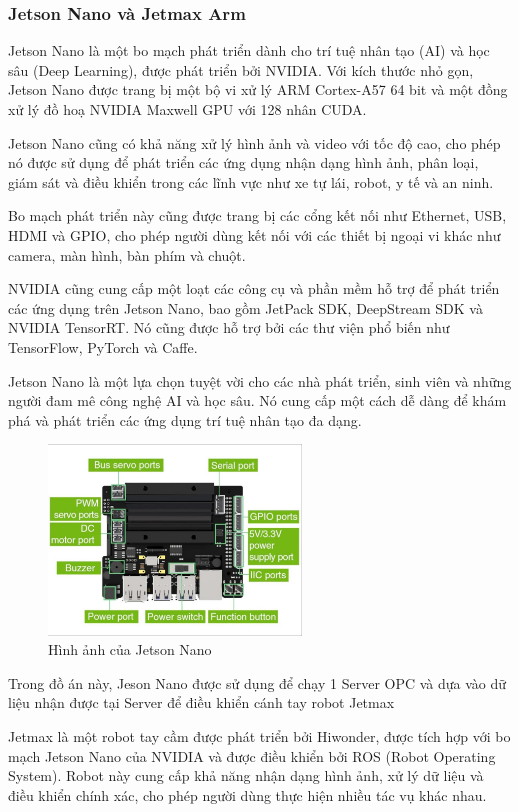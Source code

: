 \subsubsection{Jetson Nano và Jetmax Arm}
Jetson Nano là một bo mạch phát triển dành cho trí tuệ nhân tạo (AI) và học sâu (Deep Learning), được phát triển bởi NVIDIA. Với kích thước nhỏ gọn, Jetson Nano được trang bị một bộ vi xử lý ARM Cortex-A57 64 bit và một đồng xử lý đồ hoạ NVIDIA Maxwell GPU với 128 nhân CUDA.

Jetson Nano cũng có khả năng xử lý hình ảnh và video với tốc độ cao, cho phép nó được sử dụng để phát triển các ứng dụng nhận dạng hình ảnh, phân loại, giám sát và điều khiển trong các lĩnh vực như xe tự lái, robot, y tế và an ninh.

Bo mạch phát triển này cũng được trang bị các cổng kết nối như Ethernet, USB, HDMI và GPIO, cho phép người dùng kết nối với các thiết bị ngoại vi khác như camera, màn hình, bàn phím và chuột.

NVIDIA cũng cung cấp một loạt các công cụ và phần mềm hỗ trợ để phát triển các ứng dụng trên Jetson Nano, bao gồm JetPack SDK, DeepStream SDK và NVIDIA TensorRT. Nó cũng được hỗ trợ bởi các thư viện phổ biến như TensorFlow, PyTorch và Caffe.

Jetson Nano là một lựa chọn tuyệt vời cho các nhà phát triển, sinh viên và những người đam mê công nghệ AI và học sâu. Nó cung cấp một cách dễ dàng để khám phá và phát triển các ứng dụng trí tuệ nhân tạo đa dạng.
\begin{figure}[!h]
    \centering
    \includegraphics[width=0.6\textwidth]{Images/Implementation/Control/JesonNano.jpg}
    \caption{Hình ảnh của Jetson Nano}
\end{figure}

Trong đồ án này, Jeson Nano được sử dụng để chạy 1 Server OPC và dựa vào dữ liệu nhận được tại Server để điều khiển cánh tay robot Jetmax

Jetmax là một robot tay cầm được phát triển bởi Hiwonder, được tích hợp với bo mạch Jetson Nano của NVIDIA và được điều khiển bởi ROS (Robot Operating System). Robot này cung cấp khả năng nhận dạng hình ảnh, xử lý dữ liệu và điều khiển chính xác, cho phép người dùng thực hiện nhiều tác vụ khác nhau.

